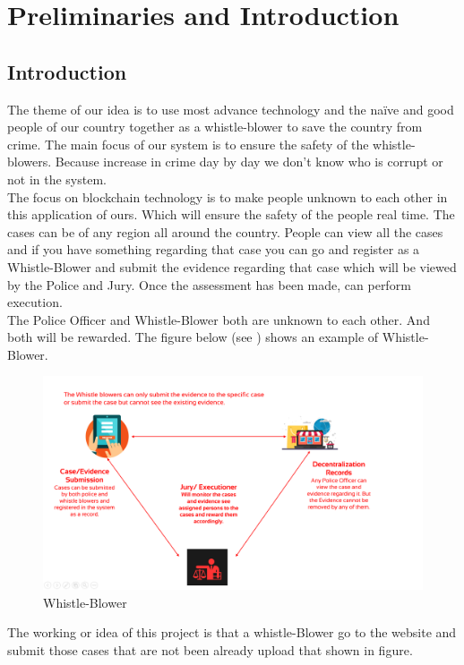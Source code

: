 \chapter{Preliminaries and Introduction\label{sec:introduction}}

\section{Introduction}
The theme of our idea is to use most advance technology and the naïve and good people of our country together as a whistle-blower to save the country from crime.  The main focus of our system is to ensure the safety of the whistle-blowers. Because increase in crime day by day we don’t know who is corrupt or not in the system.\\
The focus on blockchain technology is to make people unknown to each other in this application of ours. Which will ensure the safety of the people real time. The cases can be of any region all around the country. People can view all the cases and if you have something regarding that case you can go and register as a Whistle-Blower and submit the evidence regarding that case which will be viewed by the Police and Jury. Once the assessment has been made, can perform execution.\\
The Police Officer and Whistle-Blower both are unknown to each other. And both will be rewarded.   The figure below (see ) shows an example of Whistle-Blower.\\
\begin{figure}[h]
	\centering
	\includegraphics[scale=0.40]{figures/01.png}
	\caption{Whistle-Blower}
	\label{fig:ist}
\end{figure}
 The working or idea of this project  is that a whistle-Blower go to the website and submit those cases that are not been already upload that shown in figure.
